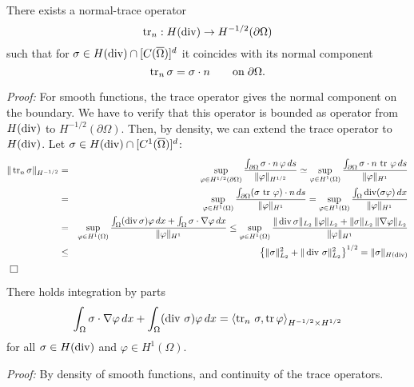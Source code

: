 \begin{theorem} There exists a normal-trace operator 
$$
\operatorname{tr}_n : H(\operatorname{div}) \rightarrow H^{-1/2} (\partial \Omega)
$$
such that for $\sigma \in H(\operatorname{div}) \cap [C(\overline \Omega)]^d$ it coincides with
its normal component
$$
\operatorname{tr}_n \sigma = \sigma \cdot n \qquad \mbox{on} \; \partial \Omega.
$$
\end{theorem}
{\em Proof:} For smooth functions, the trace operator gives the normal
component on the boundary. We have to verify that this operator is bounded
as operator from $H(\operatorname{div})$ to $H^{-1/2}(\partial \Omega)$. Then, by 
density, we can extend the trace operator to $H(\operatorname{div})$. Let $\sigma \in H(\operatorname{div}) \cap [C^1(\overline \Omega)]^d$:
\begin{eqnarray*}
\| \operatorname{tr}_n \sigma \|_{H^{-1/2}} 
& = & \sup_{\varphi \in H^{1/2}(\partial \Omega)} \frac{ \int_{\partial \Omega} \sigma \cdot n \, \varphi \, ds } { \| \varphi \|_{H^{1/2} }} 
\simeq 
\sup_{\varphi \in H^1(\Omega)} \frac{ \int_{\partial \Omega} \sigma \cdot n \, \operatorname{tr} \, \varphi \, ds } { \| \varphi \|_{H^1 }} \\
& = & 
\sup_{\varphi \in H^1(\Omega)} \frac{ \int_{\partial \Omega} (\sigma \, \operatorname{tr} \, \varphi) \cdot n \, ds } { \| \varphi \|_{H^1 }} 
=
\sup_{\varphi \in H^1(\Omega)} \frac{ \int_{\Omega} \operatorname{div} (\sigma  \varphi) \, dx } { \| \varphi \|_{H^1 }} \\
& = & 
\sup_{\varphi \in H^1(\Omega)} \frac{ \int_{\Omega} (\operatorname{div} \sigma)  \varphi \, dx +   \int_{\Omega} \sigma \cdot \nabla \varphi \, dx } { \| \varphi \|_{H^1 }} \leq
\sup_{\varphi \in H^1(\Omega)} \frac{ \| \operatorname{div} \sigma \|_{L_2} \, \| \varphi \|_{L_2} + \| \sigma \|_{L_2} \, \| \nabla \varphi \|_{L_2} } { \| \varphi \|_{H^1 }} \\
& \leq & \left\{ \| \sigma \|_{L_2}^2 + \| \operatorname{div} \, \sigma \|_{L_2}^2 \right\}^{1/2}
 = \| \sigma \|_{H(\operatorname{div})}
\end{eqnarray*}
\hfill $\Box$

\medskip

\begin{lemma} There holds integration by parts
$$
\int_\Omega \sigma \cdot \nabla \varphi \, dx + \int_\Omega (\operatorname{div} \, \sigma) \varphi \, dx = \left< \operatorname{tr}_n \, \sigma , \operatorname{tr} \varphi \right>_{H^{-1/2} \times H^{1/2}}
$$
for all $\sigma \in H(\operatorname{div})$ and $\varphi \in H^1(\Omega)$.
\end{lemma}
{\em Proof:} By density of smooth functions, and continuity of the trace operators.

\medskip

